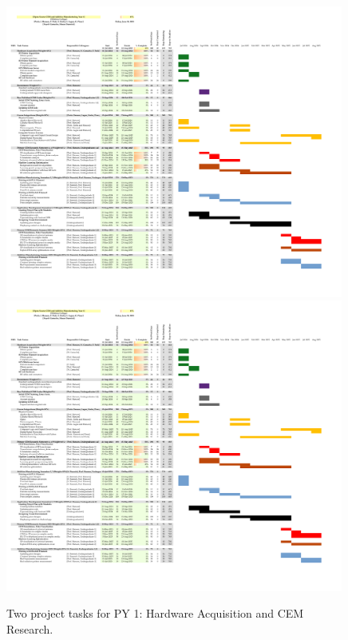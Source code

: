 \documentclass[11pt]{amsart}
\begin{document}
\begin{figure}
\centering
\includegraphics[width=0.99\textwidth,trim=0.6cm 12.2cm 10.05cm 1.75cm,clip=true]{project_planning/cem_project_gantt_yr1.pdf}
\includegraphics[width=0.99\textwidth,trim=0.6cm 7.0cm 10.05cm 7.9cm,clip=true]{project_planning/cem_project_gantt_yr1.pdf}
\caption{\label{fig:gantt_1} Two project tasks for PY 1: Hardware Acquisition and CEM Research.}
\end{figure}
\end{document}
